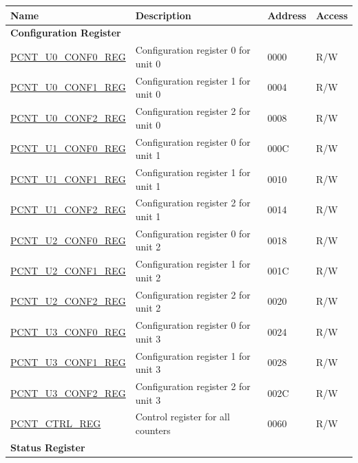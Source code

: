 \begin{longtable}{ | p{6cm} | p{7.2cm} | p{1.3cm} | p{1cm} | }
\hline\rowcolor{lightgray}
Name & Description &  Address & Access \\ \hline
\endhead
\multicolumn{4}{|l|}{\textbf{Configuration Register}} \\ \hline
\hyperref[regdesc:PCNTUNCONF0REG]{PCNT\_U0\_CONF0\_REG} & Configuration register 0 for unit 0 & \hexprefix{}0000 & R/W \\ \hline
\hyperref[regdesc:PCNTUNCONF1REG]{PCNT\_U0\_CONF1\_REG} & Configuration register 1 for unit 0 & \hexprefix{}0004 & R/W \\ \hline
\hyperref[regdesc:PCNTUNCONF2REG]{PCNT\_U0\_CONF2\_REG} & Configuration register 2 for unit 0 & \hexprefix{}0008 & R/W \\ \hline
\hyperref[regdesc:PCNTUNCONF0REG]{PCNT\_U1\_CONF0\_REG} & Configuration register 0 for unit 1 & \hexprefix{}000C & R/W \\ \hline
\hyperref[regdesc:PCNTUNCONF1REG]{PCNT\_U1\_CONF1\_REG} & Configuration register 1 for unit 1 & \hexprefix{}0010 & R/W \\ \hline
\hyperref[regdesc:PCNTUNCONF2REG]{PCNT\_U1\_CONF2\_REG} & Configuration register 2 for unit 1 & \hexprefix{}0014 & R/W \\ \hline
\hyperref[regdesc:PCNTUNCONF0REG]{PCNT\_U2\_CONF0\_REG} & Configuration register 0 for unit 2 & \hexprefix{}0018 & R/W \\ \hline
\hyperref[regdesc:PCNTUNCONF1REG]{PCNT\_U2\_CONF1\_REG} & Configuration register 1 for unit 2 & \hexprefix{}001C & R/W \\ \hline
\hyperref[regdesc:PCNTUNCONF2REG]{PCNT\_U2\_CONF2\_REG} & Configuration register 2 for unit 2 & \hexprefix{}0020 & R/W \\ \hline
\hyperref[regdesc:PCNTUNCONF0REG]{PCNT\_U3\_CONF0\_REG} & Configuration register 0 for unit 3 & \hexprefix{}0024 & R/W \\ \hline
\hyperref[regdesc:PCNTUNCONF1REG]{PCNT\_U3\_CONF1\_REG} & Configuration register 1 for unit 3 & \hexprefix{}0028 & R/W \\ \hline
\hyperref[regdesc:PCNTUNCONF2REG]{PCNT\_U3\_CONF2\_REG} & Configuration register 2 for unit 3 & \hexprefix{}002C & R/W \\ \hline
\hyperref[regdesc:PCNTCTRLREG]{PCNT\_CTRL\_REG} & Control register for all counters & \hexprefix{}0060 & R/W \\ \hline
\multicolumn{4}{|l|}{\textbf{Status Register}} \\ \hline

\end{longtable}
